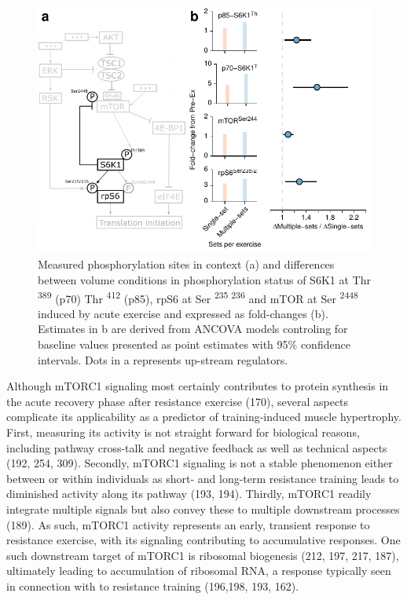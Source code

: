 \documentclass[twoside,10pt]{gihclass} %
\begin{document}
\begin{figure}

{\centering \includegraphics{thesis_files/figure-latex/mtor-fig-1} 

}

\caption[Differences between volume conditions in exercise induced phosphorylation of proteins related to mTORC1 signaling]{Measured phosphorylation sites in context (a) and differences between volume conditions in phosphorylation status of S6K1 at Thr \textsuperscript{389} (p70) Thr \textsuperscript{412} (p85), rpS6 at Ser \textsuperscript{235 236} and mTOR at Ser \textsuperscript{2448} induced by acute exercise and expressed as fold-changes (b). Estimates in b are derived from ANCOVA models controling for baseline values presented as point estimates with 95\% confidence intervals. Dots in a represents up-stream regulators.}\label{fig:mtor-fig}
\end{figure}
Although mTORC1 signaling most certainly contributes to protein synthesis in the acute recovery phase after resistance exercise (170),
several aspects complicate its applicability as a predictor of training-induced muscle hypertrophy.
First, measuring its activity is not straight forward for biological reasons, including pathway cross-talk and negative feedback as well as technical aspects
(192, 254, 309).
Secondly, mTORC1 signaling is not a stable phenomenon either between or within individuals as short- and long-term resistance training leads to diminished activity along its pathway
(193, 194).
Thirdly, mTORC1 readily integrate multiple signals but also convey these to multiple downstream processes
(189).
As such, mTORC1 activity represents an early, transient response to resistance exercise, with its signaling contributing to accumulative responses.
One such downstream target of mTORC1 is ribosomal biogenesis
(212, 197, 217, 187),
ultimately leading to accumulation of ribosomal RNA, a response typically seen in connection with to resistance training
(196,198, 193, 162).
\end{document}
